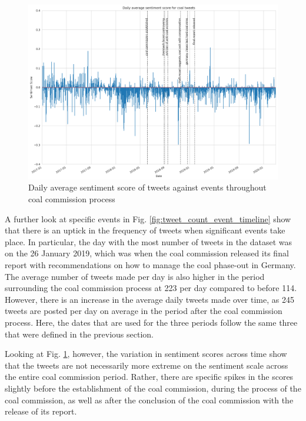 \documentclass[12pt,onecolumn,twoside]{layout}
\begin{document}
\begin{figure}
	\begin{center}
		\includegraphics[width=\textwidth]{figures/sa_tweet_score_event_timeline3}
	\end{center}
	\caption{Daily average sentiment score of tweets against events throughout coal commission process}
	\label{fig:tweet_score_event_timeline}
\end{figure}

A further look at specific events in Fig. \ref{fig:tweet_count_event_timeline} show that there is an uptick in the frequency of tweets when significant events take place. In particular, the day with the most number of tweets in the dataset was on the 26 January 2019, which was when the coal commission released its final report with recommendations on how to manage the coal phase-out in Germany. The average number of tweets made per day is also higher in the period surrounding the coal commission process at 223 per day compared to before 114. However, there is an increase in the average daily tweets made over time, as 245 tweets are posted per day on average in the period after the coal commission process. Here, the dates that are used for the three periods follow the same three that were defined in the previous section.

Looking at Fig. \ref{fig:tweet_score_event_timeline}, however, the variation in sentiment scores across time show that the tweets are not necessarily more extreme on the sentiment scale across the entire coal commission period. Rather, there are specific spikes in the scores slightly before the establishment of the coal commission, during the process of the coal commission, as well as after the conclusion of the coal commission with the release of its report.
\end{document}
